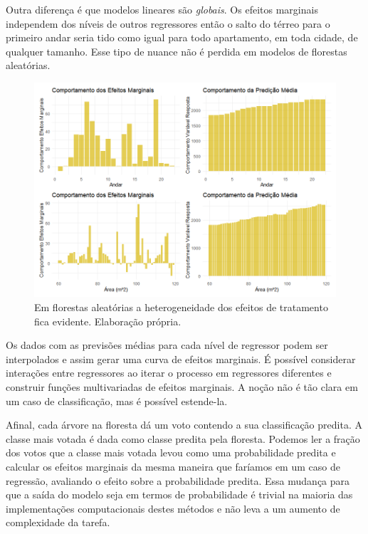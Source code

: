 Outra diferença é que modelos lineares são \textit{globais}. Os efeitos marginais independem dos níveis de outros regressores então o salto do térreo para o primeiro andar seria tido como igual para todo apartamento, em toda cidade, de qualquer tamanho. Esse tipo de nuance não é perdida em modelos de florestas aleatórias. 

\begin{figure}[H]
    \centering
    \includegraphics[scale = .70]{imagens/efeitos_marginais_RF.png}
    \caption{Em florestas aleatórias a heterogeneidade dos efeitos de tratamento fica evidente. Elaboração própria.}
\end{figure}

Os dados com as previsões médias para cada nível de regressor podem ser interpolados e assim gerar uma curva de efeitos marginais. É possível considerar interações entre regressores ao iterar o processo em regressores diferentes e construir funções multivariadas de efeitos marginais. A noção não é tão clara em um caso de classificação, mas é possível estende-la. 

Afinal, cada árvore na floresta dá um voto contendo a sua classificação predita. A classe mais votada é dada como classe predita pela floresta. Podemos ler a fração dos votos que a classe mais votada levou como uma probabilidade predita e calcular os efeitos marginais da mesma maneira que faríamos em um caso de regressão, avaliando o efeito sobre a probabilidade predita. Essa mudança para que a saída do modelo seja em termos de probabilidade é trivial na maioria das implementações computacionais destes métodos e não leva a um aumento de complexidade da tarefa.










